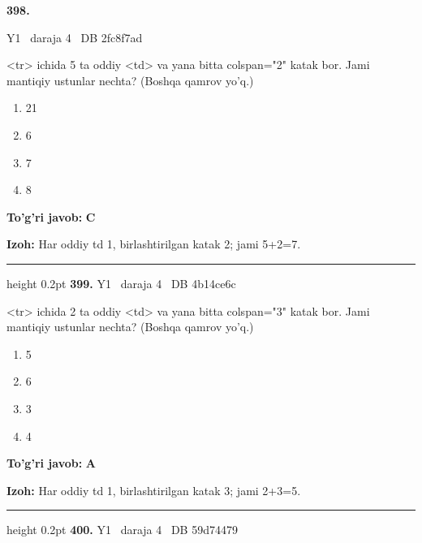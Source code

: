 \documentclass[10pt,a4paper,oneside]{article}
\begin{document}
\hypertarget{q398}{\textbf{\color{ink}398.}}  {\color{muted}\scriptsize Y1 \textbullet\ daraja 4 \textbullet\ DB 2fc8f7ad}
\par
\textless{}tr\textgreater{} ichida 5 ta oddiy \textless{}td\textgreater{} va yana bitta colspan="2" katak bor. Jami mantiqiy ustunlar nechta? (Boshqa qamrov yo'q.)
\begin{enumerate}[label=\Alph*),leftmargin=9mm]
\item 21
\item 6
\item 7
\item 8
\end{enumerate}
\begin{tcolorbox}[enhanced,breakable,colback=teal!4,colframe=teal!45!black,boxrule=0.45pt,arc=1.2mm,left=2.8mm,right=2.8mm,top=2mm,bottom=2mm,before skip=2mm,after skip=2mm]
\textbf{\color{teal}To'g'ri javob:} \textbf{C}
\par\smallskip
\textbf{Izoh:} Har oddiy td 1, birlashtirilgan katak 2; jami 5+2=7.
\end{tcolorbox}
\vspace{2mm}\hrule height 0.2pt \vspace{4mm}
\hypertarget{q399}{\textbf{\color{ink}399.}}  {\color{muted}\scriptsize Y1 \textbullet\ daraja 4 \textbullet\ DB 4b14ce6c}
\par
\textless{}tr\textgreater{} ichida 2 ta oddiy \textless{}td\textgreater{} va yana bitta colspan="3" katak bor. Jami mantiqiy ustunlar nechta? (Boshqa qamrov yo'q.)
\begin{enumerate}[label=\Alph*),leftmargin=9mm]
\item 5
\item 6
\item 3
\item 4
\end{enumerate}
\begin{tcolorbox}[enhanced,breakable,colback=teal!4,colframe=teal!45!black,boxrule=0.45pt,arc=1.2mm,left=2.8mm,right=2.8mm,top=2mm,bottom=2mm,before skip=2mm,after skip=2mm]
\textbf{\color{teal}To'g'ri javob:} \textbf{A}
\par\smallskip
\textbf{Izoh:} Har oddiy td 1, birlashtirilgan katak 3; jami 2+3=5.
\end{tcolorbox}
\vspace{2mm}\hrule height 0.2pt \vspace{4mm}
\hypertarget{q400}{\textbf{\color{ink}400.}}  {\color{muted}\scriptsize Y1 \textbullet\ daraja 4 \textbullet\ DB 59d74479}
\end{document}

